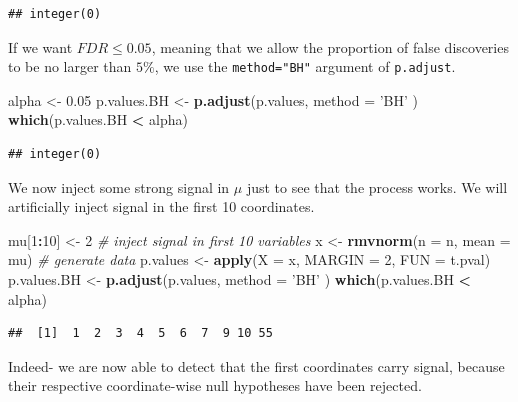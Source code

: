 \documentclass[]{book}
\newenvironment{Shaded}{\begin{snugshade}}{\end{snugshade}}
\newcommand{\CommentTok}[1]{\textcolor[rgb]{0.56,0.35,0.01}{\textit{#1}}}
\newcommand{\DataTypeTok}[1]{\textcolor[rgb]{0.13,0.29,0.53}{#1}}
\newcommand{\DecValTok}[1]{\textcolor[rgb]{0.00,0.00,0.81}{#1}}
\newcommand{\FloatTok}[1]{\textcolor[rgb]{0.00,0.00,0.81}{#1}}
\newcommand{\KeywordTok}[1]{\textcolor[rgb]{0.13,0.29,0.53}{\textbf{#1}}}
\newcommand{\NormalTok}[1]{#1}
\newcommand{\OperatorTok}[1]{\textcolor[rgb]{0.81,0.36,0.00}{\textbf{#1}}}
\newcommand{\StringTok}[1]{\textcolor[rgb]{0.31,0.60,0.02}{#1}}
\theoremstyle{definition}
\theoremstyle{definition}
\theoremstyle{definition}
\theoremstyle{remark}
\begin{document}
\begin{verbatim}
## integer(0)
\end{verbatim}

If we want \(FDR \leq 0.05\), meaning that we allow the proportion of false discoveries to be no larger than \(5\%\), we use the \texttt{method="BH"} argument of \texttt{p.adjust}.

\begin{Shaded}
\begin{Highlighting}[]
\NormalTok{alpha <-}\StringTok{ }\FloatTok{0.05}
\NormalTok{p.values.BH <-}\StringTok{ }\KeywordTok{p.adjust}\NormalTok{(p.values, }\DataTypeTok{method =} \StringTok{'BH'}\NormalTok{ )}
\KeywordTok{which}\NormalTok{(p.values.BH }\OperatorTok{<}\StringTok{ }\NormalTok{alpha)}
\end{Highlighting}
\end{Shaded}

\begin{verbatim}
## integer(0)
\end{verbatim}

We now inject some strong signal in \(\mu\) just to see that the process works.
We will artificially inject signal in the first 10 coordinates.

\begin{Shaded}
\begin{Highlighting}[]
\NormalTok{mu[}\DecValTok{1}\OperatorTok{:}\DecValTok{10}\NormalTok{] <-}\StringTok{ }\DecValTok{2} \CommentTok{# inject signal in first 10 variables}
\NormalTok{x <-}\StringTok{ }\KeywordTok{rmvnorm}\NormalTok{(}\DataTypeTok{n =}\NormalTok{ n, }\DataTypeTok{mean =}\NormalTok{ mu) }\CommentTok{# generate data}
\NormalTok{p.values <-}\StringTok{ }\KeywordTok{apply}\NormalTok{(}\DataTypeTok{X =}\NormalTok{ x, }\DataTypeTok{MARGIN =} \DecValTok{2}\NormalTok{, }\DataTypeTok{FUN =}\NormalTok{ t.pval) }
\NormalTok{p.values.BH <-}\StringTok{ }\KeywordTok{p.adjust}\NormalTok{(p.values, }\DataTypeTok{method =} \StringTok{'BH'}\NormalTok{ )}
\KeywordTok{which}\NormalTok{(p.values.BH }\OperatorTok{<}\StringTok{ }\NormalTok{alpha)}
\end{Highlighting}
\end{Shaded}

\begin{verbatim}
##  [1]  1  2  3  4  5  6  7  9 10 55
\end{verbatim}

Indeed- we are now able to detect that the first coordinates carry signal, because their respective coordinate-wise null hypotheses have been rejected.
\end{document}
